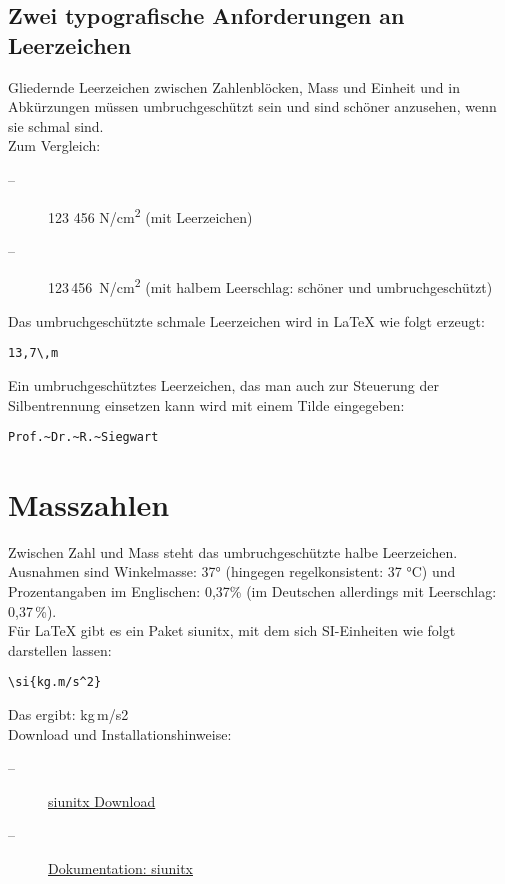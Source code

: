 \subsection{Zwei typografische Anforderungen an Leerzeichen}

Gliedernde Leerzeichen zwischen Zahlenblöcken, Mass und Einheit und in Abkürzungen müssen umbruchgeschützt sein und sind schöner anzusehen, wenn sie schmal sind. \\

Zum Vergleich:
\begin{description}
  \item[--] 123 456 N/cm\textsuperscript{2} (mit Leerzeichen)
  \item[--] 123\,456 N/cm\textsuperscript{2} (mit halbem Leerschlag: schöner und umbruchgeschützt)
\end{description}

Das umbruchgeschützte schmale Leerzeichen wird in LaTeX wie folgt erzeugt: \begin{verbatim}13,7\,m\end{verbatim}

Ein umbruchgeschütztes Leerzeichen, das man auch zur Steuerung der Silbentrennung einsetzen kann wird mit einem Tilde eingegeben:
\begin{verbatim}Prof.~Dr.~R.~Siegwart\end{verbatim}

\section{Masszahlen}

Zwischen Zahl und Mass steht das umbruchgeschützte halbe Leerzeichen. Ausnahmen sind Winkelmasse: 37° (hingegen regelkonsistent: 37 °C) und Prozentangaben im Englischen: 0,37\% (im Deutschen allerdings mit Leerschlag: 0,37\,\%). \\

Für LaTeX gibt es ein Paket siunitx, mit dem sich SI-Einheiten wie folgt darstellen lassen:
\begin{verbatim}
\si{kg.m/s^2} 
\end{verbatim}

Das ergibt: kg\,m/s2 \\

Download und Installationshinweise:
\begin{description}
\item[--] \href{https://ctan.org/pkg/siunitx?lang=de}{siunitx Download}
\item[--] \href{https://mirror.kumi.systems/ctan/macros/latex/contrib/siunitx/siunitx.pdf}{Dokumentation: siunitx}
\end{description}

